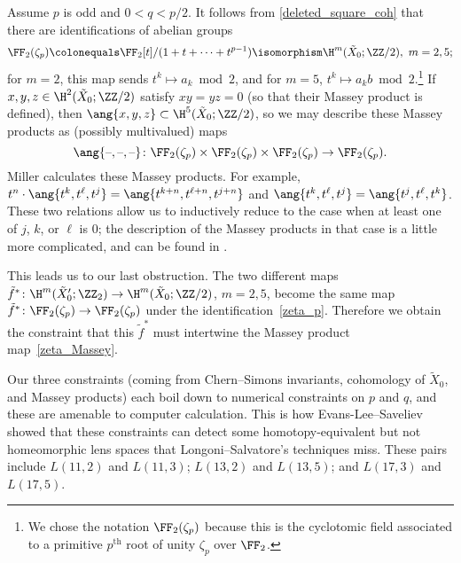 Assume $p$ is odd and $0 < q < p/2$. It follows from \cref{deleted_square_coh} that there are identifications of
abelian groups
\begin{equation}
\label{zeta_p}
	\FF_2(\zeta_p) \colonequals \FF_2[t]/(1 + t + \cdots + t^{p-1}) \isomorphism \H^m(\tilde X_0;\ZZ/2),\ m = 2,5;
\end{equation}
for $m = 2$, this map sends $t^k\mapsto a_k\bmod 2$, and for $m = 5$, $t^k\mapsto a_kb\bmod 2$.\footnote{We chose
the notation $\FF_2(\zeta_p)$ because this is the cyclotomic field associated to a primitive $p^{\mathrm{th}}$ root
of unity $\zeta_p$ over $\FF_2$.} If $x,y,z\in
\H^2(\tilde X_0;\ZZ/2)$ satisfy $xy = yz = 0$ (so that their Massey product is defined), then $\ang{x,y,z}\subset
\H^5(\tilde X_0;\ZZ/2)$, so we may describe these Massey products as (possibly multivalued) maps
\begin{equation}
\label{zeta_Massey}
	\ang{\text{--}, \text{--}, \text{--}}\colon \FF_2(\zeta_p)\times\FF_2(\zeta_p)\times\FF_2(\zeta_p)\to
	\FF_2(\zeta_p).
\end{equation}
Miller \cite[Theorem 3.33]{Mil11} calculates these Massey products. For example, $t^n\cdot \ang{t^k,t^\ell, t^j} =
\ang{t^{k+n}, t^{\ell+n}, t^{j+n}}$ and $\ang{t^k, t^\ell, t^j} = \ang{t^j, t^\ell, t^k}$. These two relations
allow us to inductively reduce to the case when at least one of $j$, $k$, or $\ell$ is $0$; the description of the
Massey products in that case is a little more complicated, and can be found in \cite[Theorem 7.1]{deletedsquare}.

This leads us to our last obstruction. The two different maps $\tilde f^*\colon \H^m(\tilde
X_0';\ZZ_2) \to \H^m (\tilde X_0;\ZZ/2)$, $m = 2,5$, become the same map $\tilde f^*\colon
\FF_2(\zeta_p)\to\FF_2(\zeta_p)$ under the identification~\eqref{zeta_p}. Therefore we obtain the constraint that
this $\tilde f^*$ must intertwine the Massey product map~\eqref{zeta_Massey}.

Our three constraints (coming from Chern--Simons invariants, cohomology of $\tilde X_0$, and Massey products) each
boil down to numerical constraints on $p$ and $q$, and these are amenable to computer calculation. This is how
Evans-Lee--Saveliev showed that these constraints can detect some homotopy-equivalent but not homeomorphic lens
spaces that Longoni--Salvatore's techniques miss. These pairs include $L(11, 2)$ and $L(11, 3)$; $L(13, 2)$ and
$L(13, 5)$; and $L(17, 3)$ and $L(17, 5)$.
